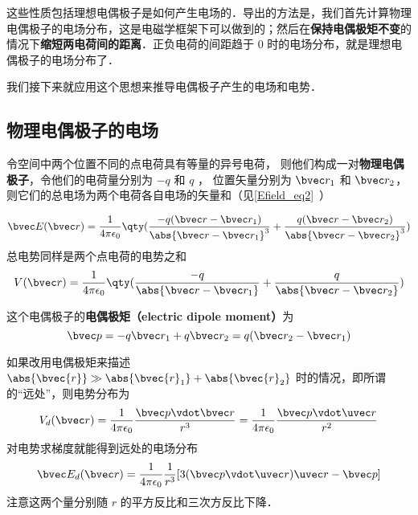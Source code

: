 这些性质包括理想电偶极子是如何产生电场的．导出的方法是，我们首先计算物理电偶极子的电场分布，这是电磁学框架下可以做到的；然后在\textbf{保持电偶极矩不变}的情况下\textbf{缩短两电荷间的距离}．正负电荷的间距趋于 $0$ 时的电场分布，就是理想电偶极子的电场分布了．

我们接下来就应用这个思想来推导电偶极子产生的电场和电势．


\subsection{物理电偶极子的电场}

令空间中两个位置不同的点电荷具有等量的异号电荷， 则他们构成一对\textbf{物理电偶极子}，令他们的电荷量分别为 $-q$ 和 $q$ ， 位置矢量分别为 $\bvec r_1$ 和 $\bvec r_2$， 则它们的总电场为两个电荷各自电场的矢量和（见\autoref{Efield_eq2}~）

\begin{equation}
\bvec E(\bvec r) = \frac{1}{4\pi\epsilon_0} \qty(\frac{-q(\bvec r - \bvec r_1)}{\abs{\bvec r - \bvec r_1}^3} + \frac{q(\bvec r - \bvec r_2)}{\abs{\bvec r - \bvec r_2}^3})
\end{equation}
总电势同样是两个点电荷的电势之和%
\begin{equation}\label{eleDpl_eq4}
V(\bvec r) = \frac{1}{4\pi\epsilon_0} \qty(\frac{-q}{\abs{\bvec r - \bvec r_1}} + \frac{q}{\abs{\bvec r - \bvec r_2}})
\end{equation}


这个电偶极子的\textbf{电偶极矩（electric dipole moment）}为
\begin{equation}\label{eleDpl_eq1}
\bvec p = -q \bvec r_1 + q \bvec r_2 = q (\bvec r_2 - \bvec r_1)
\end{equation} 

如果改用电偶极矩来描述 $\abs{\bvec{r}}\gg\\\abs{\bvec{r}_1}+\abs{\bvec{r}_2}$ 时的情况，即所谓的“远处”，则电势分布为
\begin{equation}\label{eleDpl_eq2}
V_d(\bvec r) = \frac{1}{4\pi\epsilon_0} \frac{\bvec p\vdot \bvec r}{r^3} = \frac{1}{4\pi\epsilon_0} \frac{\bvec p \vdot \uvec r}{r^2}
\end{equation}
对电势求梯度就能得到远处的电场分布
\begin{equation}\label{eleDpl_eq3}
\bvec E_d(\bvec r) = \frac{1}{4\pi\epsilon_0} \frac{1}{r^3} [3(\bvec p \vdot \uvec r) \uvec r - \bvec p]
\end{equation}
注意这两个量分别随 $r$ 的平方反比和三次方反比下降．

